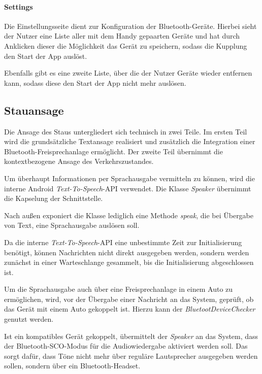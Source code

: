 \paragraph*{Settings}
Die Einstellungsseite dient zur Konfiguration der Bluetooth-Geräte.
Hierbei sieht der Nutzer eine Liste aller mit dem Handy gepaarten Geräte und hat durch Anklicken dieser die Möglichkeit das Gerät zu speichern, sodass die Kupplung den Start der App auslöst.

Ebenfalls gibt es eine zweite Liste, über die der Nutzer Geräte wieder entfernen kann, sodass diese den Start der App nicht mehr auslösen.

\subsection{Stauansage}
Die Ansage des Staus untergliedert sich technisch in zwei Teile. Im ersten Teil wird die grundsätzliche Textansage realisiert und zusätzlich die Integration einer Bluetooth-Freisprechanlage ermöglicht.
Der zweite Teil übernimmt die kontextbezogene Ansage des Verkehrszustandes.

Um überhaupt Informationen per Sprachausgabe vermitteln zu können, wird die interne Android {\em Text-To-Speech}-API verwendet.
Die Klasse {\em Speaker} übernimmt die Kapselung der Schnittstelle.

Nach außen exponiert die Klasse lediglich eine Methode {\em speak}, die bei Übergabe von Text, eine Sprachausgabe auslösen soll.

Da die interne {\em Text-To-Speech}-API eine unbestimmte Zeit zur Initialisierung benötigt, können Nachrichten nicht direkt ausgegeben werden, sondern werden zunächst in einer Warteschlange gesammelt, bis die Initialisierung abgeschlossen ist.

Um die Sprachausgabe auch über eine Freisprechanlage in einem Auto zu ermöglichen, wird, vor der Übergabe einer Nachricht an das System, geprüft, ob das Gerät mit einem Auto gekoppelt ist. Hierzu kann der {\em BluetootDeviceChecker} genutzt werden.

Ist ein kompatibles Gerät gekoppelt, übermittelt der {\em Speaker} an das System, dass der Bluetooth-SCO-Modus für die Audiowiedergabe aktiviert werden soll. Das sorgt dafür, dass Töne nicht mehr über reguläre Lautsprecher ausgegeben werden sollen, sondern über ein Bluetooth-Headset.

